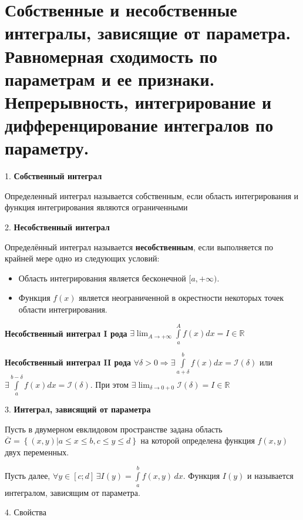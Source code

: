 \section{
    Собственные и несобственные интегралы, зависящие от параметра. \\
    Равномерная сходимость по параметрам и ее признаки. \\
    Непрерывность, интегрирование и дифференцирование интегралов по параметру.
}

1. \textbf{Собственный интеграл}

Определенный интеграл называется собственным, если область интегрирования и функция интегрирования являются ограниченными

2. \textbf{Несобственный интеграл}

Определённый интеграл называется \textbf{несобственным}, 
если выполняется по крайней мере одно из следующих условий:
\begin{itemize}
    \item Область интегрирования является бесконечной ${\displaystyle [a,+\infty )}$.
    \item Функция ${\displaystyle f(x)}$ является неограниченной 
    в окрестности некоторых точек области интегрирования.
\end{itemize}

\textbf{Несобственный интеграл I рода} ${\displaystyle \exists \lim _{A\to +\infty }\int \limits _{a}^{A}f(x)dx=I\in \mathbb {R} }$

\textbf{Несобственный интеграл II рода} ${\displaystyle \forall \delta >0\Rightarrow \exists \int \limits _{a+\delta }^{b}f(x)dx={\mathcal {I}}(\delta )}$ или 
${\displaystyle \exists \int \limits _{a}^{b-\delta }f(x)dx={\mathcal {I}}(\delta )}$.
При этом
${\displaystyle \exists \lim _{\delta \to 0+0}{\mathcal {I}}(\delta )=I\in \mathbb {R} }$

3. \textbf{Интеграл, зависящий от параметра}

Пусть в двумерном евклидовом пространстве задана область ${\displaystyle {\overline {G}}=\left\{\left(x,y\right)|a\leq x\leq b,c\leq y\leq d\right\}}$
на которой определена функция ${\displaystyle f(x,y)}$ двух переменных.

Пусть далее, ${\displaystyle \forall y\in \left[c;d\right]\,\exists I\left(y\right)=\int \limits _{a}^{b}f\left(x,y\right)\,dx}$.
Функция ${\displaystyle I(y)}$ и называется интегралом, зависящим от параметра.

4. Свойства

